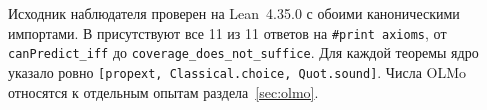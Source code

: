 Исходник наблюдателя проверен на Lean~4.35.0 с обоими каноническими импортами. В  присутствуют все 11 из 11 ответов на \texttt{\#print axioms}, от \texttt{canPredict\_iff} до \texttt{coverage\_does\_not\_suffice}. Для каждой теоремы ядро указало ровно \texttt{[propext, Classical.choice, Quot.sound]}. Числа OLMo относятся к отдельным опытам раздела~\ref{sec:olmo}.
